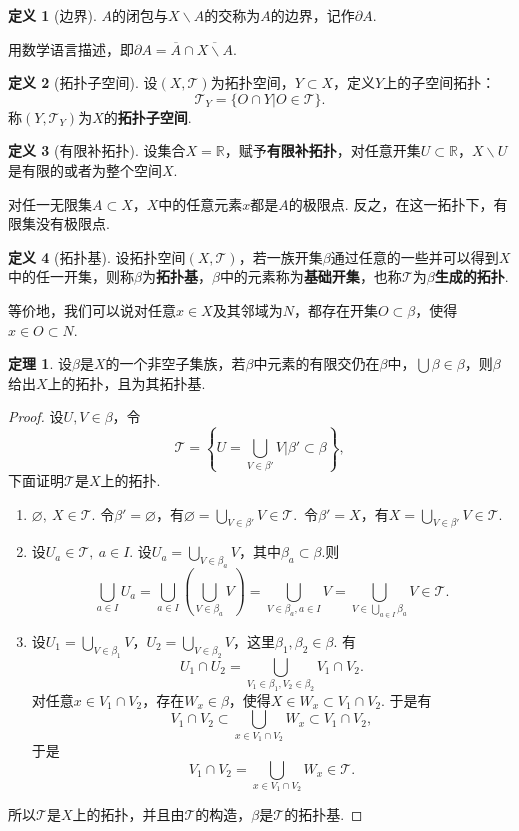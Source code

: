 \documentclass[12pt]{ctexart}
\theoremstyle{definition}
\newtheorem{definition}{定义}
\newtheorem{theorem}{定理}
\theoremstyle{plain}
\begin{document}
	\begin{definition}[边界]
		$A$的闭包与$X\backslash A$的交称为$A$的边界，记作$\partial A$.
	\end{definition}
	用数学语言描述，即$\partial A=\overline{A}\cap\overline{X\backslash A}$.
	\begin{definition}[拓扑子空间]
		设$(X,\mathcal{T})$为拓扑空间，$Y\subset X$，定义$Y$上的子空间拓扑：
		$$\mathcal{T}_Y=\{O\cap Y|O\in\mathcal{T}\}.$$
		称$(Y,\mathcal{T}_Y)$为$X$的\textbf{拓扑子空间}.
	\end{definition}
	\begin{definition}[有限补拓扑]
		设集合$X=\mathbb{R}$，赋予\textbf{有限补拓扑}，对任意开集$U\subset\mathbb{R}$，$X\backslash U$是有限的或者为整个空间$X$.
	\end{definition}
	对任一无限集$A\subset X$，$X$中的任意元素$x$都是$A$的极限点. 反之，在这一拓扑下，有限集没有极限点.
	\begin{definition}[拓扑基]
		设拓扑空间$(X,\mathcal{T})$，若一族开集$\beta$通过任意的一些并可以得到$X$中的任一开集，则称$\beta$为\textbf{拓扑基}，$\beta$中的元素称为\textbf{基础开集}，也称$\mathcal{T}$为$\beta$\textbf{生成的拓扑}.
	\end{definition}
	等价地，我们可以说对任意$x\in X$及其邻域为$N$，都存在开集$O\subset \beta$，使得$x\in O\subset N$.
	\begin{theorem}
		设$\beta$是$X$的一个非空子集族，若$\beta$中元素的有限交仍在$\beta$中，$\bigcup\beta\in\beta$，则$\beta$给出$X$上的拓扑，且为其拓扑基.
	\end{theorem}
	\begin{proof}
		设$U,V\in\beta$，令
		$$\mathcal{T}=\left\{U=\bigcup_{V\in\beta'}V\bigg|\beta'\subset\beta\right\},$$
		下面证明$\mathcal{T}$是$X$上的拓扑.
		\begin{enumerate}
			\item $\varnothing,\ X\in\mathcal{T}$. 令$\beta'=\varnothing$，有$\varnothing=\bigcup_{V\in\beta'}V\in\mathcal{T}$.\ 令$\beta'=X$，有$X=\bigcup_{V\in\beta'}V\in\mathcal{T}$.
			\item 设$U_a\in\mathcal{T},\ a\in I$. 设$U_a=\bigcup_{V\in\beta_a}V$，其中$\beta_a\subset\beta$.则
			$$\bigcup_{a\in I}U_a=\bigcup_{a\in I}\left(\bigcup_{V\in\beta_a}V\right)=\bigcup_{V\in\beta_a,a\in I}V=\bigcup_{V\in\bigcup_{a\in I}\beta_a}V\in\mathcal{T}.$$
			\item 设$U_1=\bigcup_{V\in\beta_1}V$，$U_2=\bigcup_{V\in\beta_2}V$，这里$\beta_1, \beta_2\in\beta$. 有
			$$U_1\cap U_2=\bigcup_{V_1\in\beta_1,V_2\in\beta_2}V_1\cap V_2.$$
			对任意$x\in V_1\cap V_2$，存在$W_x\in \beta$，使得$X\in W_x\subset V_1\cap V_2$. 于是有
			$$V_1\cap V_2\subset\bigcup_{x\in V_1\cap V_2}W_x\subset V_1\cap V_2,$$
			于是
			$$V_1\cap V_2=\bigcup_{x\in V_1\cap V_2}W_x\in\mathcal{T}.$$
		\end{enumerate}
		所以$\mathcal{T}$是$X$上的拓扑，并且由$\mathcal{T}$的构造，$\beta$是$\mathcal{T}$的拓扑基.
	\end{proof}
\end{document}
